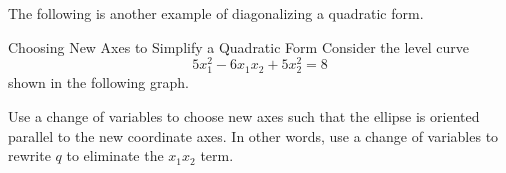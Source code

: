 The following is another example of diagonalizing a quadratic form. 

\begin{example}{Choosing New Axes to Simplify a Quadratic Form}\label{exa:newaxes2}
Consider the level curve
\begin{equation*}
5x_1^{2}-6x_1x_2+5x_2^{2}=8
\end{equation*} 
shown in the following graph. 

\begin{center}
\end{center}

Use a change of variables to choose new axes such that the ellipse is oriented parallel to the new coordinate axes. In other words, use a change of variables to rewrite $q$ to eliminate the $x_1x_2$ term. 
\end{example}

